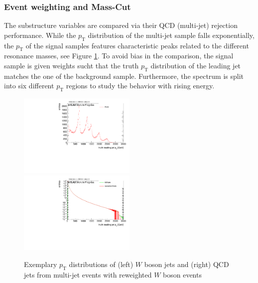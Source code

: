 \subsubsection{Event weighting and Mass-Cut}
The substructure variables are compared via their QCD (multi-jet) rejection performance. While the $p_{\mathrm{T}}$ distribution of the multi-jet sample falls exponentially, the $p_{\mathrm{T}}$ of the signal samples features characteristic peaks related to the different resonance masses, see Figure \ref{fig:p_T}. To avoid bias in the comparison, the signal sample is given weights sucht that the truth $p_{\mathrm{T}}$ distribution of the leading jet matches the one of the background sample. Furthermore, the spectrum is split into six different $p_{\mathrm{T}}$ regions to study the behavior with rising energy. 
\begin{figure} 
	\includegraphics[width=0.5\textwidth]{sascha_input/plots/track_selection/h_leadpt_truth.pdf} \hspace{1mm}
	\includegraphics[width=0.5\textwidth]{sascha_input/plots/track_selection/h_leadpt_truth_weight.pdf}
\caption{\footnotesize{Exemplary $p_{\mathrm{T}}$ distributions of (left) $W$ boson jets and (right) QCD jets from multi-jet events with reweighted $W$ boson events}}\label{fig:p_T}
\end{figure}

